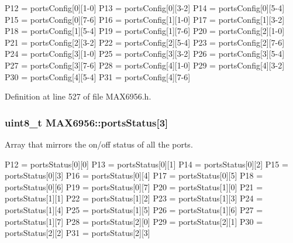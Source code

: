 P12 = ports\-Config\mbox{[}0\mbox{]}\mbox{[}1-\/0\mbox{]} P13 = ports\-Config\mbox{[}0\mbox{]}\mbox{[}3-\/2\mbox{]} P14 = ports\-Config\mbox{[}0\mbox{]}\mbox{[}5-\/4\mbox{]} P15 = ports\-Config\mbox{[}0\mbox{]}\mbox{[}7-\/6\mbox{]} P16 = ports\-Config\mbox{[}1\mbox{]}\mbox{[}1-\/0\mbox{]} P17 = ports\-Config\mbox{[}1\mbox{]}\mbox{[}3-\/2\mbox{]} P18 = ports\-Config\mbox{[}1\mbox{]}\mbox{[}5-\/4\mbox{]} P19 = ports\-Config\mbox{[}1\mbox{]}\mbox{[}7-\/6\mbox{]} P20 = ports\-Config\mbox{[}2\mbox{]}\mbox{[}1-\/0\mbox{]} P21 = ports\-Config\mbox{[}2\mbox{]}\mbox{[}3-\/2\mbox{]} P22 = ports\-Config\mbox{[}2\mbox{]}\mbox{[}5-\/4\mbox{]} P23 = ports\-Config\mbox{[}2\mbox{]}\mbox{[}7-\/6\mbox{]} P24 = ports\-Config\mbox{[}3\mbox{]}\mbox{[}1-\/0\mbox{]} P25 = ports\-Config\mbox{[}3\mbox{]}\mbox{[}3-\/2\mbox{]} P26 = ports\-Config\mbox{[}3\mbox{]}\mbox{[}5-\/4\mbox{]} P27 = ports\-Config\mbox{[}3\mbox{]}\mbox{[}7-\/6\mbox{]} P28 = ports\-Config\mbox{[}4\mbox{]}\mbox{[}1-\/0\mbox{]} P29 = ports\-Config\mbox{[}4\mbox{]}\mbox{[}3-\/2\mbox{]} P30 = ports\-Config\mbox{[}4\mbox{]}\mbox{[}5-\/4\mbox{]} P31 = ports\-Config\mbox{[}4\mbox{]}\mbox{[}7-\/6\mbox{]} 

Definition at line 527 of file M\-A\-X6956.\-h.

\hypertarget{classMAX6956_ae8da9a65da74dce7eb907319b0198847}{
\subsubsection[{ports\-Status}]{\setlength{\rightskip}{0pt plus 5cm}uint8\-\_\-t M\-A\-X6956\-::ports\-Status\mbox{[}3\mbox{]}}}\label{classMAX6956_ae8da9a65da74dce7eb907319b0198847}
Array that mirrors the on/off status of all the ports.

P12 = ports\-Status\mbox{[}0\mbox{]}\mbox{[}0\mbox{]} P13 = ports\-Status\mbox{[}0\mbox{]}\mbox{[}1\mbox{]} P14 = ports\-Status\mbox{[}0\mbox{]}\mbox{[}2\mbox{]} P15 = ports\-Status\mbox{[}0\mbox{]}\mbox{[}3\mbox{]} P16 = ports\-Status\mbox{[}0\mbox{]}\mbox{[}4\mbox{]} P17 = ports\-Status\mbox{[}0\mbox{]}\mbox{[}5\mbox{]} P18 = ports\-Status\mbox{[}0\mbox{]}\mbox{[}6\mbox{]} P19 = ports\-Status\mbox{[}0\mbox{]}\mbox{[}7\mbox{]} P20 = ports\-Status\mbox{[}1\mbox{]}\mbox{[}0\mbox{]} P21 = ports\-Status\mbox{[}1\mbox{]}\mbox{[}1\mbox{]} P22 = ports\-Status\mbox{[}1\mbox{]}\mbox{[}2\mbox{]} P23 = ports\-Status\mbox{[}1\mbox{]}\mbox{[}3\mbox{]} P24 = ports\-Status\mbox{[}1\mbox{]}\mbox{[}4\mbox{]} P25 = ports\-Status\mbox{[}1\mbox{]}\mbox{[}5\mbox{]} P26 = ports\-Status\mbox{[}1\mbox{]}\mbox{[}6\mbox{]} P27 = ports\-Status\mbox{[}1\mbox{]}\mbox{[}7\mbox{]} P28 = ports\-Status\mbox{[}2\mbox{]}\mbox{[}0\mbox{]} P29 = ports\-Status\mbox{[}2\mbox{]}\mbox{[}1\mbox{]} P30 = ports\-Status\mbox{[}2\mbox{]}\mbox{[}2\mbox{]} P31 = ports\-Status\mbox{[}2\mbox{]}\mbox{[}3\mbox{]} 

